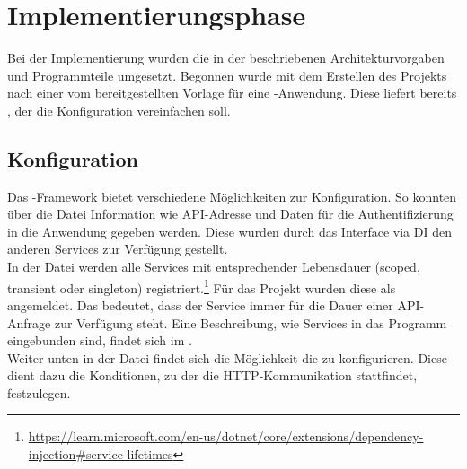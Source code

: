 \section{Implementierungsphase} 
\label{sec:Implementierungsphase}
Bei der Implementierung wurden die in der  beschriebenen Architekturvorgaben
und Programmteile umgesetzt. Begonnen wurde mit dem Erstellen des Projekts nach einer vom 
bereitgestellten Vorlage für eine -Anwendung. Diese liefert bereits ,
der \zB die Konfiguration vereinfachen soll.

\subsection{Konfiguration}
\label{sec:Konfiguration}
Das -Framework bietet verschiedene Möglichkeiten zur Konfiguration.
So konnten über die Datei  Information wie API-Adresse und Daten für die
Authentifizierung in die Anwendung gegeben werden. Diese wurden durch das Interface 
via \acs{DI} den anderen Services zur Verfügung gestellt. \\
In der Datei  werden alle Services mit entsprechender Lebensdauer (scoped, transient oder singleton)
registriert.\footnote{\url{https://learn.microsoft.com/en-us/dotnet/core/extensions/dependency-injection\#service-lifetimes}}
Für das Projekt wurden diese als  angemeldet. Das bedeutet, dass der Service immer für die Dauer einer
API-Anfrage zur Verfügung steht. Eine Beschreibung, wie Services in das Programm eingebunden sind, findet sich im 
.\\
Weiter unten in der Datei findet sich die Möglichkeit die  zu konfigurieren.
Diese dient dazu die Konditionen, zu der die \acs{HTTP}-Kommunikation stattfindet, festzulegen.



